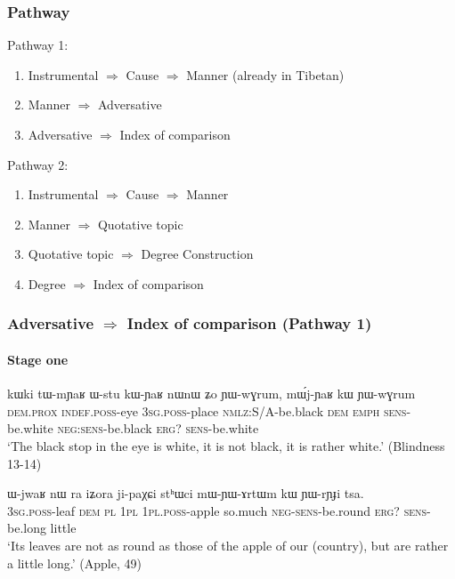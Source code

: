 \documentclass[xcolor=table]{beamer}
\newcommand{\ipa}[1]{{\phon \mbox{#1}}} %
\begin{document}
  \begin{frame} 
 \frametitle{Pathway} 
 Pathway 1:
\begin{enumerate}
\item Instrumental $\Rightarrow$ Cause $\Rightarrow$ Manner (already in Tibetan)
\item Manner  $\Rightarrow$ Adversative
\item Adversative $\Rightarrow$ Index of comparison
\end{enumerate}

Pathway 2:
\begin{enumerate}
\item Instrumental $\Rightarrow$ Cause $\Rightarrow$ Manner 
\item Manner  $\Rightarrow$ Quotative topic
\item Quotative topic  $\Rightarrow$ Degree Construction
\item Degree $\Rightarrow$ Index of comparison
\end{enumerate}
\end{frame}     

  \begin{frame} 
 \frametitle{Adversative $\Rightarrow$ Index of comparison (Pathway 1)}
  \framesubtitle{Stage one}
\begin{exe}
  \ex  \label{ex:mWjYaR.kW}  
  \gll 
\ipa{kɯki}  	\ipa{tɯ-mɲaʁ}  	\ipa{ɯ-stu}  	\ipa{kɯ-ɲaʁ}  	\ipa{nɯnɯ}  	\ipa{ʑo}  	\ipa{ɲɯ-wɣrum,}  	\ipa{mɯ́j-ɲaʁ}  	\ipa{kɯ}  	\ipa{ɲɯ-wɣrum}   	\\
\textsc{dem.prox} \textsc{indef.poss}-eye \textsc{3sg.poss}-place \textsc{nmlz}:S/A-be.black \textsc{dem} \textsc{emph} \textsc{sens}-be.white \textsc{neg:sens}-be.black \textsc{erg}? \textsc{sens}-be.white   \\
  \glt `The black stop in the eye is white, it is not black, it is rather white.' (Blindness 13-14)
        \end{exe} 
        
\begin{exe}
  \ex  \label{ex:mWYArtWm.kW}  
  \gll      
\ipa{ɯ-jwaʁ} 	\ipa{nɯ} \ipa{ra} 	\ipa{iʑora} 	\ipa{ji-paχɕi} 	\ipa{stʰɯci} 	\ipa{mɯ-ɲɯ-ɤrtɯm}	\ipa{kɯ} 	\ipa{ɲɯ-rɲɟi} 	\ipa{tsa.} \\
\textsc{3sg.poss}-leaf \textsc{dem} \textsc{pl} \textsc{1pl} \textsc{1pl.poss}-apple so.much \textsc{neg-sens}-be.round \textsc{erg?} \textsc{sens}-be.long little \\
\glt `Its leaves  are not as round as those of the apple of our (country), but are rather a little long.'
(Apple, 49)
\end{exe} 

\end{frame}     
\end{document}
